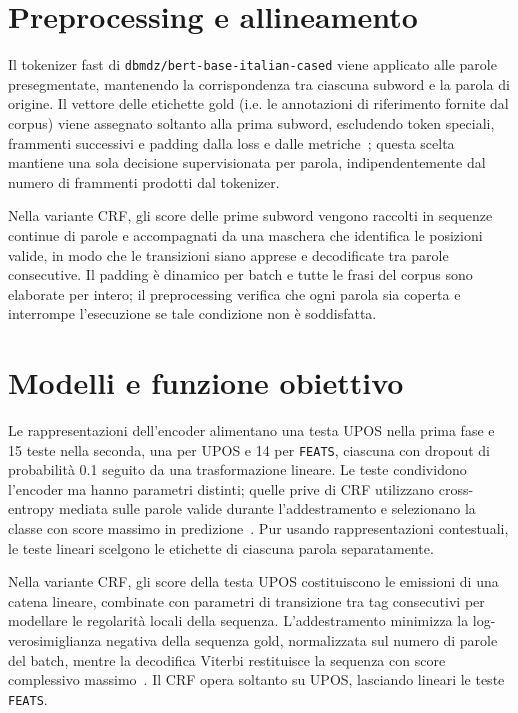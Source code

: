\documentclass[12pt,a4paper]{report}
\begin{document}
\section{Preprocessing e allineamento}
\label{sec:method-preprocessing}

Il tokenizer fast di \texttt{dbmdz/bert-base-italian-cased} viene applicato alle parole presegmentate, mantenendo la corrispondenza tra ciascuna subword e la parola di origine. Il vettore delle etichette gold (i.e. le annotazioni di riferimento fornite dal corpus) viene assegnato soltanto alla prima subword, escludendo token speciali, frammenti successivi e padding dalla loss e dalle metriche~\cite{hf}; questa scelta mantiene una sola decisione supervisionata per parola, indipendentemente dal numero di frammenti prodotti dal tokenizer.

Nella variante CRF, gli score delle prime subword vengono raccolti in sequenze continue di parole e accompagnati da una maschera che identifica le posizioni valide, in modo che le transizioni siano apprese e decodificate tra parole consecutive. Il padding è dinamico per batch e tutte le frasi del corpus sono elaborate per intero; il preprocessing verifica che ogni parola sia coperta e interrompe l'esecuzione se tale condizione non è soddisfatta.

\section{Modelli e funzione obiettivo}
\label{sec:method-objective}

Le rappresentazioni dell'encoder alimentano una testa UPOS nella prima fase e 15 teste nella seconda, una per UPOS e 14 per \texttt{FEATS}, ciascuna con dropout di probabilità 0.1 seguito da una trasformazione lineare. Le teste condividono l'encoder ma hanno parametri distinti; quelle prive di CRF utilizzano cross-entropy mediata sulle parole valide durante l'addestramento e selezionano la classe con score massimo in predizione~\cite{hf}. Pur usando rappresentazioni contestuali, le teste lineari scelgono le etichette di ciascuna parola separatamente.

Nella variante CRF, gli score della testa UPOS costituiscono le emissioni di una catena lineare, combinate con parametri di transizione tra tag consecutivi per modellare le regolarità locali della sequenza. L'addestramento minimizza la log-verosimiglianza negativa della sequenza gold, normalizzata sul numero di parole del batch, mentre la decodifica Viterbi restituisce la sequenza con score complessivo massimo~\cite{crf}. Il CRF opera soltanto su UPOS, lasciando lineari le teste \texttt{FEATS}.
\end{document}
